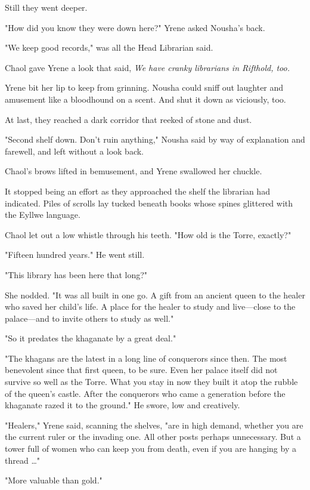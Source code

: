 Still they went deeper.

"How did you know they were down here?"
Yrene asked Nousha's back.

"We keep good records," was all the Head Librarian said.

Chaol gave Yrene a look that said, \emph{We have cranky librarians in Rifthold, too.}

Yrene bit her lip to keep from grinning.
Nousha could sniff out laughter and amusement like a bloodhound on a scent.
And shut it down as viciously, too.

At last, they reached a dark corridor that reeked of stone and dust.

"Second shelf down.
Don't ruin anything," Nousha said by way of explanation and farewell, and left without a look back.

Chaol's brows lifted in bemusement, and Yrene swallowed her chuckle.

It stopped being an effort as they approached the shelf the librarian had indicated.
Piles of scrolls lay tucked beneath books whose spines glittered with the Eyllwe language.

Chaol let out a low whistle through his teeth.
"How old is the Torre, exactly?"

"Fifteen hundred years."
He went still.

"This library has been here that long?"

She nodded.
"It was all built in one go.
A gift from an ancient queen to the healer who saved her child's life.
A place for the healer to study and live---close to the palace---and to invite others to study as well."

"So it predates the khaganate by a great deal."

"The khagans are the latest in a long line of conquerors since then.
The most benevolent since that first queen, to be sure.
Even her palace itself did not survive so well as the Torre.
What you stay in now  they built it atop the rubble of the queen's castle.
After the conquerors who came a generation before the khaganate razed it to the ground."
He swore, low and creatively.

"Healers," Yrene said, scanning the shelves, "are in high demand, whether you are the current ruler or the invading one.
All other posts  perhaps unnecessary.
But a tower full of women who can keep you from death, even if you are hanging by a thread \ldots"

"More valuable than gold."

